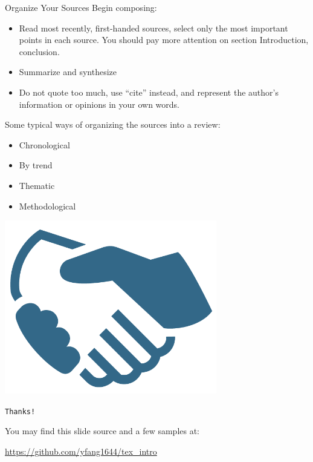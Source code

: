 \documentclass[10pt,t]{beamer}
\begin{document}
\begin{frame}{Organize Your Sources}
Begin composing:
\begin{itemize}
    \item Read most recently, first-handed sources, select only
        the most important points in each source. You should pay
        more attention on section \alert{Introduction},
        \alert{conclusion}.
    \item Summarize and synthesize
    \item Do not quote too much, use ``\alert{cite}'' instead, and
        represent the author's information or opinions in your own words.
\end{itemize}
Some typical ways of organizing the sources into a review:
\begin{itemize}
    \item Chronological
    \item By trend
    \item Thematic
    \item Methodological
\end{itemize}
\end{frame}
\fi
\begin{frame}
\begin{center}
\includegraphics[width=.5\textwidth]{shakinghands.png}

\texttt{\Huge Thanks!}
\end{center}
\vfill

You may find this slide source and a few samples at:

   \url{https://github.com/yfang1644/tex_intro}
\end{frame}
\end{document}
